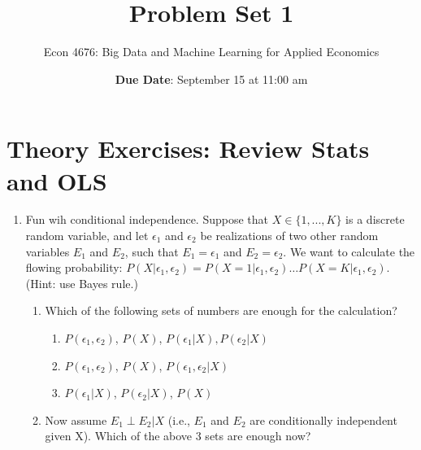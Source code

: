 \documentclass[12pt,onecolumn]{article}
\title{Problem Set 1}
\subtitle{Econ 4676: Big Data and Machine Learning for Applied Economics}
\author{{\bf Due Date}: September 15 at 11:00 am}
\date{}
\begin{document}
\maketitle

\section{Theory Exercises: Review Stats and OLS}

\begin{enumerate}

  \item Fun wih conditional independence.  Suppose that $X\in \{1,...,K\} $ is a discrete random variable, and let $\epsilon_1$ and $\epsilon_2$ be realizations of two other random variables $E_1$ and $E_2$, such that $E_1=\epsilon_1$ and $E_2=\epsilon_2$. We want to calculate the flowing probability: $P(X|\epsilon_1,\epsilon_2)= P(X=1|\epsilon_1,\epsilon_2)\dots  P(X=K|\epsilon_1,\epsilon_2)$. (Hint: use Bayes rule.)
  \begin{enumerate}
  \item Which of the following sets of numbers are enough for the calculation?
  \begin{enumerate}
    \item $P(\epsilon_1,\epsilon_2)$, $P(X)$, $P(\epsilon_1|X), P(\epsilon_2|X)$
    \item $P(\epsilon_1,\epsilon_2)$, $P(X)$, $P(\epsilon_1,\epsilon_2|X)$ 
    \item $P(\epsilon_1|X)$, $P(\epsilon_2|X)$, $P(X)$
    \end{enumerate}
    \item Now  assume $E_1 \perp E_2|X$ (i.e., $E_1$ and $E_2$ are conditionally independent given X). Which of the above 3 sets are enough now?
  \end{enumerate}

 


\end{enumerate}
\end{document}
